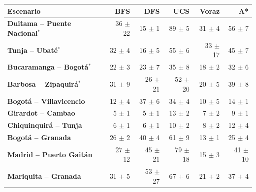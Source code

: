 \renewcommand{\arraystretch}{1.2}
\begin{tabular}{|l|r|r|r|r|r|}
\hline
\rowcolor{gray!20} \textbf{Escenario} & \textbf{BFS} & \textbf{DFS} & \textbf{UCS} & \textbf{Voraz} & \textbf{A*} \\
\hline
\textbf{Duitama -- Puente Nacional$^{*}$} & 36 $\pm$ 22 & 15 $\pm$ 1 & 89 $\pm$ 5 & 31 $\pm$ 4 & 56 $\pm$ 7 \\
\hline
\textbf{Tunja -- Ubaté$^{*}$} & 32 $\pm$ 4 & 16 $\pm$ 5 & 55 $\pm$ 6 & 33 $\pm$ 17 & 45 $\pm$ 7 \\
\hline
\textbf{Bucaramanga -- Bogotá$^{*}$} & 22 $\pm$ 3 & 23 $\pm$ 7 & 35 $\pm$ 8 & 18 $\pm$ 2 & 32 $\pm$ 6 \\
\hline
\textbf{Barbosa -- Zipaquirá$^{*}$} & 31 $\pm$ 9 & 26 $\pm$ 21 & 52 $\pm$ 20 & 20 $\pm$ 5 & 39 $\pm$ 8 \\
\hline
\textbf{Bogotá -- Villavicencio} & 12 $\pm$ 4 & 37 $\pm$ 6 & 34 $\pm$ 4 & 10 $\pm$ 5 & 14 $\pm$ 1 \\
\hline
\textbf{Girardot -- Cambao} & 5 $\pm$ 1 & 5 $\pm$ 1 & 13 $\pm$ 2 & 7 $\pm$ 2 & 9 $\pm$ 1 \\
\hline
\textbf{Chiquinquirá -- Tunja} & 6 $\pm$ 1 & 6 $\pm$ 1 & 10 $\pm$ 2 & 8 $\pm$ 2 & 12 $\pm$ 4 \\
\hline
\textbf{Bogotá -- Granada} & 26 $\pm$ 2 & 40 $\pm$ 4 & 61 $\pm$ 9 & 13 $\pm$ 1 & 25 $\pm$ 4 \\
\hline
\textbf{Madrid -- Puerto Gaitán} & 27 $\pm$ 12 & 45 $\pm$ 21 & 79 $\pm$ 18 & 15 $\pm$ 3 & 41 $\pm$ 10 \\
\hline
\textbf{Mariquita -- Granada} & 31 $\pm$ 5 & 53 $\pm$ 27 & 67 $\pm$ 6 & 21 $\pm$ 2 & 37 $\pm$ 4 \\
\hline
\end{tabular}

